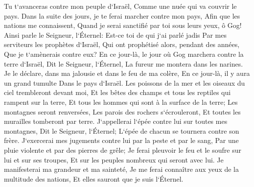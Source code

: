 \verse Tu t`avanceras contre mon peuple d`Israël, Comme une nuée qui va couvrir le pays. Dans la suite des jours, je te ferai marcher contre mon pays, Afin que les nations me connaissent, Quand je serai sanctifié par toi sous leurs yeux, ô Gog! 
\verse Ainsi parle le Seigneur, l`Éternel: Est-ce toi de qui j`ai parlé jadis Par mes serviteurs les prophètes d`Israël, Qui ont prophétisé alors, pendant des années, Que je t`amènerais contre eux? 
\verse En ce jour-là, le jour où Gog marchera contre la terre d`Israël, Dit le Seigneur, l`Éternel, La fureur me montera dans les narines. 
\verse Je le déclare, dans ma jalousie et dans le feu de ma colère, En ce jour-là, il y aura un grand tumulte Dans le pays d`Israël. 
\verse Les poissons de la mer et les oiseaux du ciel trembleront devant moi, Et les bêtes des champs et tous les reptiles qui rampent sur la terre, Et tous les hommes qui sont à la surface de la terre; Les montagnes seront renversées, Les parois des rochers s`écrouleront, Et toutes les murailles tomberont par terre. 
\verse J`appellerai l`épée contre lui sur toutes mes montagnes, Dit le Seigneur, l`Éternel; L`épée de chacun se tournera contre son frère. 
\verse J`exercerai mes jugements contre lui par la peste et par le sang, Par une pluie violente et par des pierres de grêle; Je ferai pleuvoir le feu et le soufre sur lui et sur ses troupes, Et sur les peuples nombreux qui seront avec lui. 
\verse Je manifesterai ma grandeur et ma sainteté, Je me ferai connaître aux yeux de la multitude des nations, Et elles sauront que je suis l`Éternel. 

